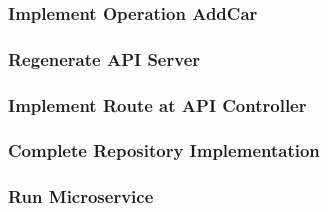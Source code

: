 \subsubsection*{Implement Operation AddCar}
\subsubsection*{Regenerate API Server}
\subsubsection*{Implement Route at API Controller}
\subsubsection*{Complete Repository Implementation}
\subsubsection*{Run Microservice}